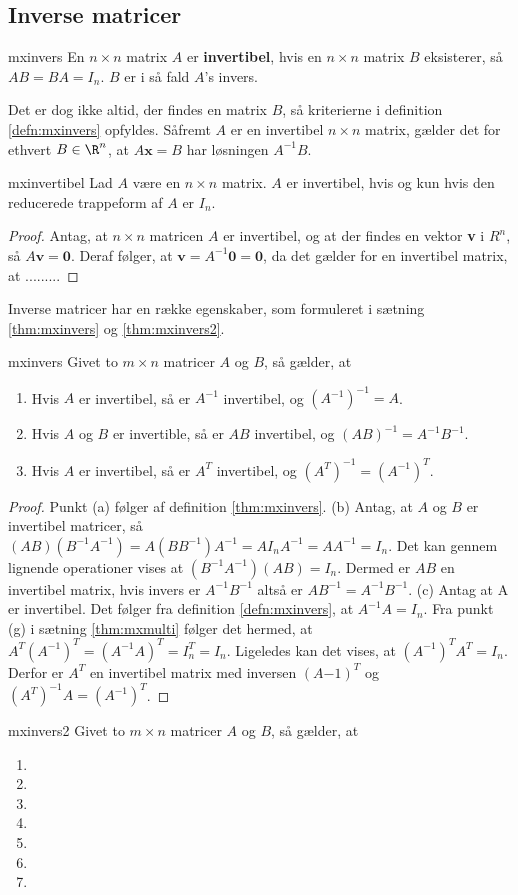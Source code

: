\subsection{Inverse matricer}

\begin{defn}{}{mxinvers}
En $n \times n$ matrix $A$ er \textbf{invertibel}, hvis en $n \times n$ matrix $B$ eksisterer, så $AB=BA=I_n$. $B$ er i så fald $A$'s invers. 
\end{defn}
Det er dog ikke altid, der findes en matrix $B$, så kriterierne i definition \ref{defn:mxinvers} opfyldes. 
Såfremt $A$ er en invertibel $n \times n$ matrix, gælder det for ethvert $B \in \R^n$, at $A\textbf{x}=B$ har løsningen $A^{-1}B$.
%
\begin{thm}{}{mxinvertibel}
Lad $A$ være en $n \times n$ matrix. 
$A$ er invertibel, hvis og kun hvis den reducerede trappeform af $A$ er $I_n$.
\end{thm}
%
\begin{proof}
Antag, at $n\times n$ matricen $A$ er invertibel, og at der findes en vektor \textbf{v} i $R^n$, så $A\textbf{v}=\textbf{0}$. 
Deraf følger, at $\textbf{v}=A^{-1}\textbf{0}=\textbf{0}$, da det gælder for en invertibel matrix, at .........
\end{proof}
Inverse matricer har en række egenskaber, som formuleret i sætning \ref{thm:mxinvers} og \ref{thm:mxinvers2}. 
%
\begin{thm}{}{mxinvers}
Givet to $m \times n$ matricer $A$ og $B$, så gælder, at
\begin{enumerate}[label=(\alph*)]
\item Hvis $A$ er invertibel, så er $A^{-1}$ invertibel, og $(A^{-1})^{-1}=A$.
\item Hvis $A$ og $B$ er invertible, så er $AB$ invertibel, og $(AB)^{-1}=A^{-1}B^{-1}$.
\item Hvis $A$ er invertibel, så er $A^T$ invertibel, og $(A^T)^{-1}=(A^{-1})^T$.
\end{enumerate}
\end{thm}
%
%
\begin{proof}
Punkt (a) følger af definition \ref{thm:mxinvers}. 
(b) Antag, at $A$ og $B$ er invertibel matricer, så $(AB)(B^{-1}A^{-1})=A(BB^{-1})A^{-1}=AI_nA^{-1}=AA^{-1}=I_n$. 
Det kan gennem lignende operationer vises at $(B^{-1}A^{-1})(AB)=I_n$.
Dermed er $AB$ en invertibel matrix, hvis invers er $A^{-1}B^{-1}$ altså er $AB^{-1}=A^{-1}B^{-1}$.
(c) Antag at A er invertibel. 
Det følger fra definition \ref{defn:mxinvers}, at $A^{-1}A=I_n$. 
Fra punkt (g) i sætning \ref{thm:mxmulti} følger det hermed, at $A^T(A^{-1})^T=(A^{-1}A)^T=I_n^T=I_n$. 
Ligeledes kan det vises, at $(A^{-1})^TA^T=I_n$. 
Derfor er $A^T$ en invertibel matrix med inversen $(A{-1})^T$ og $(A^T)^{-1}A=(A^{-1})^T$.
\end{proof}
%
%
\begin{thm}{}{mxinvers2}
Givet to $m \times n$ matricer $A$ og $B$, så gælder, at
\begin{enumerate}[label=(\alph*)]
\item 
\item 
\item 
\item 
\item 
\item 
\item 

\end{enumerate}
\end{thm}
